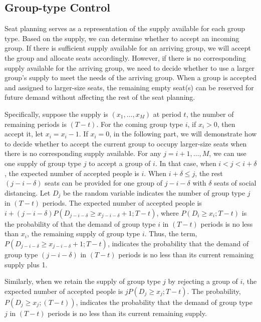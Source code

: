 
\subsection{Group-type Control}\label{nested_policy}
Seat planning serves as a representation of the supply available for each group type. Based on the supply, we can determine whether to accept an incoming group. If there is sufficient supply available for an arriving group, we will accept the group and allocate seats accordingly. However, if there is no corresponding supply available for the arriving group, we need to decide whether to use a larger group's supply to meet the needs of the arriving group. When a group is accepted and assigned to larger-size seats, the remaining empty seat(s) can be reserved for future demand without affecting the rest of the seat planning.

Specifically, suppose the supply is $(x_1, \ldots, x_M)$ at period $t$, the number of remaining periods is $(T-t)$. For the coming group type $i$, if $x_i > 0$, then accept it, let $x_i = x_i -1$.
If $x_i = 0$, in the following part, we will demonstrate how to decide whether to accept the current group to occupy larger-size seats when there is no corresponding supply available. For any $j=i+1, \ldots, M$, we can use one supply of group type $j$ to accept a group of $i$. In that case, when $i <j < i+\delta$, the expected number of accepted people is $i$. When $i+\delta \leq j$, the rest $(j-i-\delta)$ seats can be provided for one group of $j-i-\delta$ with $\delta$ seats of social distancing. Let $D_j$ be the random variable indicates the number of group type $j$ in $(T-t)$ periods. The expected number of accepted people is $i + (j-i-\delta)P(D_{j-i-\delta} \geq x_{j-i-\delta}+1; T-t)$, where $P(D_i \geq x_i; T-t)$ is the probability of that the demand of group type $i$ in $(T-t)$ periods is no less than $x_i$, the remaining supply of group type $i$. Thus, the term, $P(D_{j-i-\delta} \geq x_{j-i-\delta}+1; T-t)$, indicates the probability that the demand of group type $(j-i-\delta)$ in $(T-t)$ periods is no less than its current remaining supply plus 1. 

Similarly, when we retain the supply of group type $j$ by rejecting a group of $i$, the expected number of accepted people is $j P(D_{j} \geq x_{j}; T-t)$. The probability, $P(D_{j} \geq x_{j}; (T-t))$, indicates the probability that the demand of group type $j$ in $(T-t)$ periods is no less than its current remaining supply.


